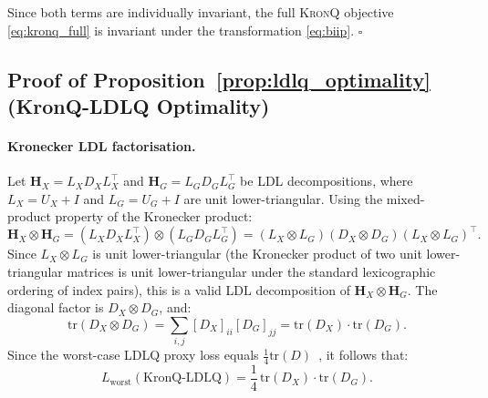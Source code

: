 \documentclass{article} %
\newcommand{\KronQ}{\textsc{KronQ}}
\begin{document}
Since both terms are individually invariant, the full \KronQ{} objective
\eqref{eq:kronq_full} is invariant under the transformation \eqref{eq:biip}.
\hfill$\square$

\subsection{Proof of Proposition~\ref{prop:ldlq_optimality} (KronQ-LDLQ Optimality)}
\label{proof:prop2}
\paragraph{Kronecker LDL factorisation.}
Let $\mathbf{H}_X = L_X D_X L_X^\top$ and $\mathbf{H}_G = L_G D_G L_G^\top$ be LDL decompositions,
where $L_X = U_X + I$ and $L_G = U_G + I$ are unit lower-triangular.
Using the mixed-product property of the Kronecker product:
\begin{equation}
    \mathbf{H}_X \otimes \mathbf{H}_G
    = (L_X D_X L_X^\top) \otimes (L_G D_G L_G^\top)
    = (L_X \otimes L_G)(D_X \otimes D_G)(L_X \otimes L_G)^\top.
\end{equation}
Since $L_X \otimes L_G$ is unit lower-triangular (the Kronecker product of two unit lower-triangular matrices is unit lower-triangular under the standard lexicographic ordering of index pairs), this is a valid LDL decomposition of $\mathbf{H}_X \otimes \mathbf{H}_G$.
The diagonal factor is $D_X \otimes D_G$, and:
\begin{equation}
    \mathrm{tr}(D_X \otimes D_G)
    = \sum_{i,j} [D_X]_{ii} [D_G]_{jj}
    = \mathrm{tr}(D_X)\cdot\mathrm{tr}(D_G).
\end{equation}
Since the worst-case LDLQ proxy loss equals $\frac{1}{4}\mathrm{tr}(D)$~\citep{chee2023quip},
it follows that:
\begin{equation}
    L_{\mathrm{worst}}(\text{KronQ-LDLQ}) = \frac{1}{4}\,\mathrm{tr}(D_X)\cdot\mathrm{tr}(D_G).
\end{equation}
\end{document}
